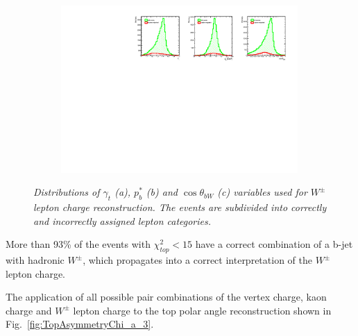 \begin{figure}
\begin{subfigure}{0.33\textwidth}
		\includegraphics[clip, trim=13.6cm 0cm 0.4cm 0.cm,width=0.99\textwidth]{ILD/plots/top-lepton-variables.pdf}
		\caption{\label{fig:TopChiVariables_c_3} }
	\end{subfigure}
	\caption{\sl Distributions of $\gamma_t$ (a), $p^*_b$ (b) and $\cos\theta_{bW}$ (c) variables used for $W^\pm$ lepton charge reconstruction. The events are subdivided into correctly and incorrectly assigned lepton categories. }
	
	\label{fig:TopChiVariables_3}
\end{figure}


More than 93\% of the events with $\chi^2_{top} < 15$ have a correct combination of a b-jet with hadronic $W^\pm$, which propagates into a correct interpretation of the $W^\pm$ lepton charge.

The application of all possible pair combinations of the vertex charge, kaon charge and $W^\pm$ lepton charge to the top polar angle reconstruction shown in Fig.~\ref{fig:TopAsymmetryChi_a_3}. 


